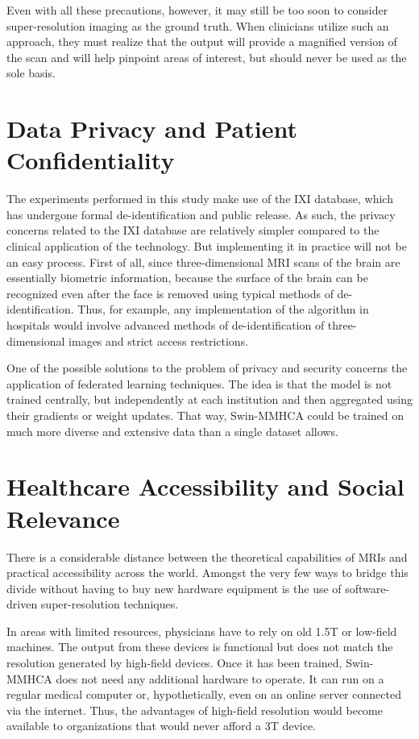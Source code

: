 Even with all these precautions, however, it may still be too soon to consider super-resolution imaging as the ground truth. When clinicians utilize such an approach, they must realize that the output will provide a magnified version of the scan and will help pinpoint areas of interest, but should never be used as the sole basis.

\section{Data Privacy and Patient Confidentiality}
The experiments performed in this study make use of the IXI database, which has undergone formal de-identification and public release. As such, the privacy concerns related to the IXI database are relatively simpler compared to the clinical application of the technology.
But implementing it in practice will not be an easy process. First of all, since three-dimensional MRI scans of the brain are essentially biometric information, because the surface of the brain can be recognized even after the face is removed using typical methods of de-identification. Thus, for example, any implementation of the algorithm in hospitals would involve advanced methods of de-identification of three-dimensional images and strict access restrictions.

One of the possible solutions to the problem of privacy and security concerns the application of federated learning techniques. The idea is that the model is not trained centrally, but independently at each institution and then aggregated using their gradients or weight updates. That way, Swin-MMHCA could be trained on much more diverse and extensive data than a single dataset allows.

\section{Healthcare Accessibility and Social Relevance}
There is a considerable distance between the theoretical capabilities of MRIs and practical accessibility across the world. Amongst the very few ways to bridge this divide without having to buy new hardware equipment is the use of software-driven super-resolution techniques.

In areas with limited resources, physicians have to rely on old 1.5T or low-field machines. The output from these devices is functional but does not match the resolution generated by high-field devices. Once it has been trained, Swin-MMHCA does not need any additional hardware to operate. It can run on a regular medical computer or, hypothetically, even on an online server connected via the internet. Thus, the advantages of high-field resolution would become available to organizations that would never afford a 3T device.

